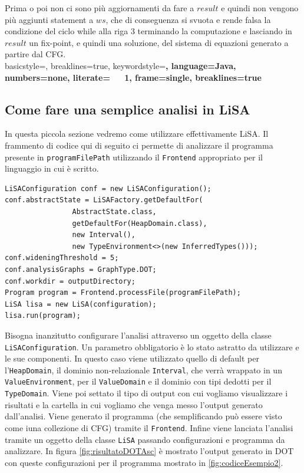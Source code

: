 Prima o poi non ci sono più aggiornamenti da fare a \(result\) e quindi non vengono più aggiunti statement a \(ws\), che di conseguenza si svuota e rende falsa la condizione del ciclo while alla riga 3 terminando la computazione e lasciando in \(result\) un fix-point, e quindi una soluzione, del sistema di equazioni generato a partire dal CFG.
\\

\lstset
    {
    basicstyle=\footnotesize\ttfamily,
    breaklines=true,
    keywordstyle=\color{keywordsColor}\bfseries,
    language=Java, 
    numbers=none,
    literate={\ \ }{{\ }}1,
    frame=single,
    breaklines=true
    }

\subsection{Come fare una semplice analisi in LiSA}
In questa piccola sezione vedremo come utilizzare effettivamente LiSA. Il frammento di codice qui di seguito ci permette di analizzare il programma presente in \texttt{programFilePath} utilizzando il \texttt{Frontend} appropriato per il linguaggio in cui è scritto. 
\label{code:simpleAnalysisAsc}
\begin{lstlisting}[belowskip=-1.1 \baselineskip]
LiSAConfiguration conf = new LiSAConfiguration();
conf.abstractState = LiSAFactory.getDefaultFor(
				AbstractState.class, 
				getDefaultFor(HeapDomain.class), 
				new Interval(),
				new TypeEnvironment<>(new InferredTypes()));
conf.wideningThreshold = 5;
conf.analysisGraphs = GraphType.DOT;
conf.workdir = outputDirectory;
Program program = Frontend.processFile(programFilePath);
LiSA lisa = new LiSA(configuration);
lisa.run(program);
\end{lstlisting}
Bisogna inanzitutto configurare l'analisi attraverso un oggetto della classe \texttt{LiSAConfiguration}. Un parametro obbligatorio è lo stato astratto da utilizzare e le sue componenti. In questo caso viene utilizzato quello di default per l'\texttt{HeapDomain}, il dominio non-relazionale \texttt{Interval}, che verrà wrappato in un \texttt{ValueEnvironment}, per il \texttt{ValueDomain} e il dominio con tipi dedotti per il \texttt{TypeDomain}. Viene poi settato il tipo di output con cui vogliamo visualizzare i risultati e la cartella in cui vogliamo che venga messo l'output generato dall'analisi. Viene generato il programma (che semplificando può essere visto come iuna collezione di CFG) tramite il \texttt{Frontend}. Infine viene lanciata l'analisi tramite un oggetto   della classe \texttt{LiSA} passando configurazioni e programma da analizzare. In figura \ref{fig:risultatoDOTAsc} è mostrato l'output generato in DOT con queste configurazioni per il programma mostrato in \ref{fig:codiceEsempio2}.
